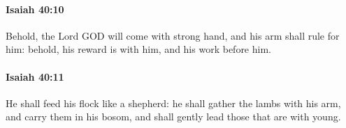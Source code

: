 		\paragraph{Isaiah 40:10} %
			\label{ISAIAH-40-10}

			Behold, the Lord GOD will come with strong hand, and his arm shall rule for him: behold, his reward is with him, and his work before him.


		\paragraph{Isaiah 40:11} %
			\label{ISAIAH-40-11}

			He shall feed his flock like a shepherd: he shall gather the lambs with his arm, and carry them in his bosom, and shall gently lead those that are with young.



